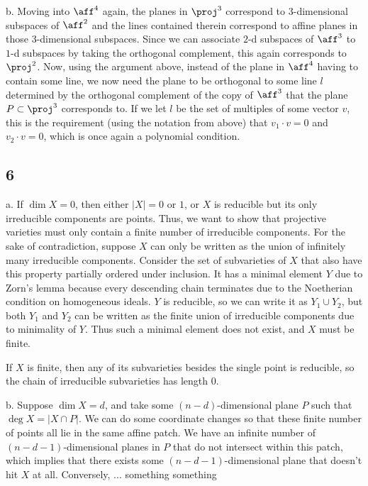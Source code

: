 \documentclass{article}
\begin{document}
b. Moving into $\aff^4$ again, the planes in $\proj^3$ correspond to $3$-dimensional subspaces of $\aff^2$ and the lines contained therein correspond to affine planes in those $3$-dimensional subspaces. Since we can associate $2$-d subspaces of $\aff^3$ to $1$-d subspaces by taking the orthogonal complement, this again corresponds to $\proj^2$. Now, using the argument above, instead of the plane in $\aff^4$ having to contain some line, we now need the plane to be orthogonal to some line $l$ determined by the orthogonal complement of the copy of $\aff^3$ that the plane $P\subset\proj^3$ corresponds to. If we let $l$ be the set of multiples of some vector $v$, this is the requirement (using the notation from above) that $v_1\cdot v=0$ and $v_2\cdot v=0$, which is once again a polynomial condition.
\subsection*{6}
a. If $\dim X=0$, then either $|X|=0$ or $1$, or $X$ is reducible but its only irreducible components are points. Thus, we want to show that projective varieties must only contain a finite number of irreducible components. For the sake of contradiction, suppose $X$ can only be written as the union of infinitely many irreducible components. Consider the set of subvarieties of $X$ that also have this property partially ordered under inclusion. It has a minimal element $Y$ due to Zorn's lemma because every descending chain terminates due to the Noetherian condition on homogeneous ideals. $Y$ is reducible, so we can write it as $Y_1\cup Y_2$, but both $Y_1$ and $Y_2$ can be written as the finite union of irreducible components due to minimality of $Y$. Thus such a minimal element does not exist, and $X$ must be finite.

If $X$ is finite, then any of its subvarieties besides the single point is reducible, so the chain of irreducible subvarieties has length $0$.

b. Suppose $\dim X=d$, and take some $(n-d)$-dimensional plane $P$ such that $\deg X=|X\cap P|$. We can do some coordinate changes so that these finite number of points all lie in the same affine patch. We have an infinite number of $(n-d-1)$-dimensional planes in $P$ that do not intersect within this patch, which implies that there exists some $(n-d-1)$-dimensional plane that doesn't hit $X$ at all. Conversely, ... something something
\end{document}
